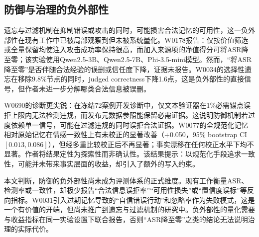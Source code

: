 \subsection{防御与治理的负外部性}

遗忘与过滤机制在抑制错误或攻击的同时，可能损害合法记忆的可用性，这一负外部性在现有工作中已被局部观察到但未被系统量化。W0178报告：仅按价值筛选或全量保留均使注入攻击成功率保持很高，而加入来源项的净值得分可将ASR降至零；该实验使用Qwen2.5-3B、Qwen2.5-7B、Phi-3.5-mini模型\cite{W0178}。然而，“将ASR降至零”是否伴随合法经验的误删或信任度下降，证据未报告。W0034的选择性遗忘在移除9.8\%节点的同时，judged correctness下降1.6点\cite{W0034}，这是负外部性的直接信号，但作者未进一步分解哪类合法信息被误删。

W0690的诊断更尖锐：在冻结72案例开发诊断中，仅文本验证器在1\%必需锚点误拒上限内无法检测违规，而发布元数据参照能保留必需证据\cite{W0690}。这说明防御机制若过度依赖单一信号，可能在过滤违规的同时误拒合法证据。W0077的全规范化记忆相对原始记忆在情感一致性上有未校正的显著改善（+0.050，95\% bootstrap CI $[0.013,0.086]$），但经多重比较校正后不再显著；事实漂移在任何校正水平下均不显著\cite{W0077}。作者将结果定性为探索性而非确认性。该结果提示：以规范化手段追求一致性，可能并未带来事实层面的收益，却引入了额外的写入约束。

本文判断，防御的负外部性尚未成为评测体系的正式维度。现有工作衡量ASR、检测率或一致性，却极少报告“合法信息误拒率”“可用性损失”或“置信度误标”等反向指标。W0031引入过期记忆导致的“自信错误行动”和忽略率作为失败模式\cite{W0031}，这是一个有价值的开端，但尚未推广到遗忘与过滤机制的研究中。负外部性的量化需要与收益指标在同一实验设置下联合报告，否则“ASR降至零”之类的结论无法说明治理的实际代价。
